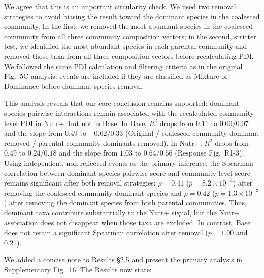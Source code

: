 
\responselabel
We agree that this is an important circularity check. We used two removal strategies to avoid biasing the result toward the dominant species in the coalesced community. In the first, we removed the most abundant species in the coalesced community from all three community composition vectors; in the second, stricter test, we identified the most abundant species in each parental community and removed those taxa from all three composition vectors before recalculating PDI\@. We followed the same PDI calculation and filtering criteria as in the original Fig.~5C analysis: events are included if they are classified as Mixture or Dominance before dominant species removal.

This analysis reveals that our core conclusion remains supported: dominant-species pairwise interactions remain associated with the recalculated community-level PDI in Nutr$+$, but not in Base. In Base, $R^2$ drops from $0.11$ to $0.00 / 0.07$ and the slope from $0.49$ to $-0.02 / 0.33$ (Original / coalesced-community dominant removed / parental-community dominants removed). In Nutr$+$, $R^2$ drops from $0.49$ to $0.24 / 0.18$ and the slope from $1.03$ to $0.64 / 0.56$ (Response Fig.~R1-3). Using independent, non-reflected events as the primary inference, the Spearman correlation between dominant-species pairwise score and community-level score remains significant after both removal strategies: $\rho = 0.41$ ($p = 8.2 \times 10^{-4}$) after removing the coalesced-community dominant species and $\rho = 0.42$ ($p = 1.3 \times 10^{-3}$) after removing the dominant species from both parental communities. Thus, dominant taxa contribute substantially to the Nutr$+$ signal, but the Nutr$+$ association does not disappear when those taxa are excluded. In contrast, Base does not retain a significant Spearman correlation after removal ($p = 1.00$ and $0.21$).

We added a concise note to Results \S2.5 and present the primary analysis in Supplementary Fig.~16. The Results now state: 

